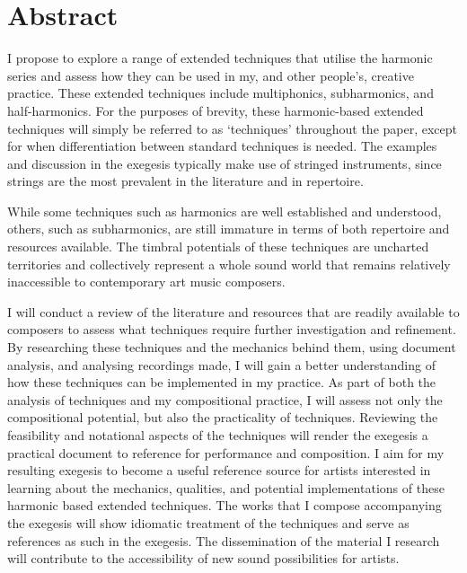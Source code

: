\chapter*{Abstract}
 

I propose to explore a range of extended techniques that utilise the harmonic series and assess how they can be used in my, and other people's, creative practice. 
These extended techniques include multiphonics, subharmonics, and half-harmonics. 
For the purposes of brevity, these harmonic-based extended techniques will simply be referred to as `techniques' throughout the paper, except for when differentiation between standard techniques is needed.
The examples and discussion in the exegesis typically make use of stringed instruments, since strings are the most prevalent in the literature and in repertoire. 

While some techniques such as harmonics are well established and understood, others, such as subharmonics, are still immature in terms of both repertoire and resources available. The timbral potentials of these techniques are uncharted territories and collectively represent a whole sound world that remains relatively inaccessible to contemporary art music composers.

I will conduct a review of the literature and resources that are readily available to composers to assess what techniques require further investigation and refinement. 
By researching these techniques and the mechanics behind them, using document analysis, and analysing recordings made, I will gain a better understanding of how these techniques can be implemented in my practice. 
As part of both the analysis of techniques and my compositional practice, I will assess not only the compositional potential, but also the practicality of techniques. 
Reviewing the feasibility and notational aspects of the techniques will render the exegesis a practical document to reference for performance and composition. 
I aim for my resulting exegesis to become a useful reference source for artists interested in learning about the mechanics, qualities, and potential implementations of these harmonic based extended techniques. 
The works that I compose accompanying the exegesis will show idiomatic treatment of the techniques and serve as references as such in the exegesis. 
The dissemination of the material I research will contribute to the accessibility of new sound possibilities for artists. 